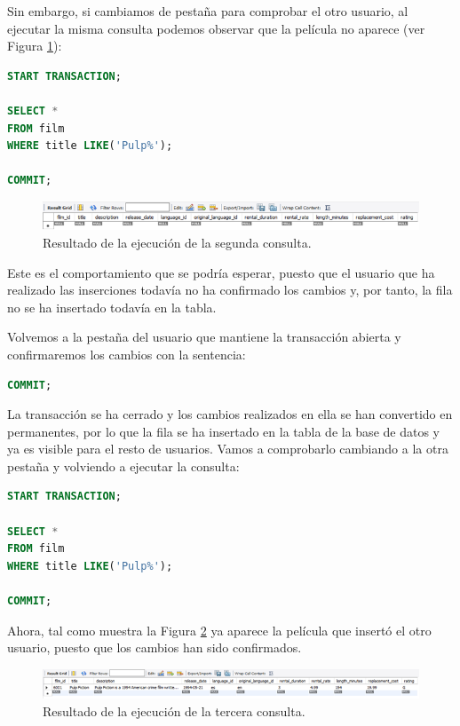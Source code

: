 \documentclass{db-practice}
\begin{document}
Sin embargo, si cambiamos de pestaña para comprobar el otro usuario, al ejecutar la misma consulta podemos observar que la película no aparece (ver Figura \ref{fig:2consulta}):

\begin{lstlisting}[language=SQL]
START TRANSACTION;

SELECT * 
FROM film
WHERE title LIKE('Pulp%');

COMMIT;
\end{lstlisting}

\begin{figure}[ht]
    \centering
    \includegraphics[width=0.9\columnwidth]{figs/2consulta.png}
    \caption{Resultado de la ejecución de la segunda consulta.}\label{fig:2consulta}
\end{figure}

Este es el comportamiento que se podría esperar, puesto que el usuario que ha realizado las inserciones todavía no ha confirmado los cambios y, por tanto, la fila no se ha insertado todavía en la tabla.

Volvemos a la pestaña del usuario que mantiene la transacción abierta y confirmaremos los cambios con la sentencia:

\begin{lstlisting}[language=SQL]
COMMIT;
\end{lstlisting}

La transacción se ha cerrado y los cambios realizados en ella se han convertido en permanentes, por lo que la fila se ha insertado en la tabla de la base de datos y ya es visible para el resto de usuarios. Vamos a comprobarlo cambiando a la otra pestaña y volviendo a ejecutar la consulta:

\begin{lstlisting}[language=SQL]
START TRANSACTION;

SELECT * 
FROM film
WHERE title LIKE('Pulp%');

COMMIT;
\end{lstlisting}

Ahora, tal como muestra la Figura \ref{fig:3consulta} ya aparece la película que insertó el otro usuario, puesto que los cambios han sido confirmados.

\begin{figure}[ht]
    \centering
    \includegraphics[width=0.9\columnwidth]{figs/3consulta.png}
    \caption{Resultado de la ejecución de la tercera consulta.}\label{fig:3consulta}
\end{figure}
\end{document}
